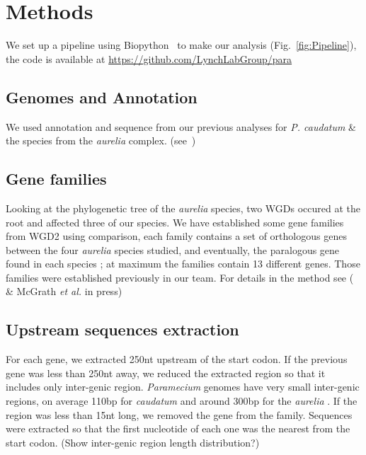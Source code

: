 \section*{Methods}

We set up a pipeline using Biopython~\citep{cock_biopython:_2009} to make our analysis (Fig.~\ref{fig:Pipeline}), the code is available at \url{https://github.com/LynchLabGroup/para}

\subsection*{Genomes and Annotation}

We used annotation and sequence from our previous analyses for \textit{P. caudatum} \& the species from the \textit{aurelia} complex. (see~\citealt{mcgrath_insights_2014})

\subsection*{Gene families}

Looking at the phylogenetic tree of the \textit{aurelia} species, two WGDs occured at the root and affected three of our species. We have established some gene families from WGD2 using comparison, each family contains a set of orthologous genes between the four \textit{aurelia} species studied, and eventually, the paralogous gene found in each species ; at maximum the families contain 13 different genes. Those families were established previously in our team. For details in the method see (\citealt{mcgrath_insights_2014} \& McGrath \textit{et al.} in press)

\subsection*{Upstream sequences extraction}

For each gene, we extracted 250nt upstream of the start codon. If the previous gene was less than 250nt away, we reduced the extracted region so that it includes only inter-genic region. \textit{Paramecium} genomes have very small inter-genic regions, on average 110bp for \textit{caudatum} and around 300bp for the \textit{aurelia} \citep{mcgrath_insights_2014}.  If the region was less than 15nt long, we removed the gene from the family. Sequences were extracted so that the first nucleotide of each one was the nearest from the start codon. (Show inter-genic region length distribution?)

